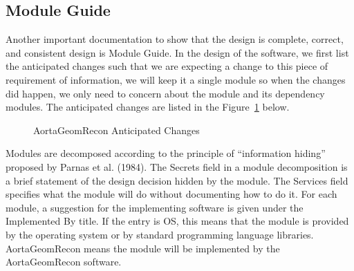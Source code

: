 \subsection{Module Guide}

Another important documentation to show that the design is complete, correct, and consistent design is Module Guide. In the design of the software, we first list the anticipated changes such that we are expecting a change to this piece of requirement of information, we will keep it a single module so when the changes did happen, we only need to concern about the module and its dependency modules. The anticipated changes are listed in the Figure~\ref{fig_agr_ac} below.

\begin{figure}[H]
    \centering
    \caption[AortaGeomRecon Anticipated Changes]{AortaGeomRecon Anticipated Changes}
    \label{fig_agr_ac}
\end{figure}

Modules are decomposed according to the principle of “information hiding” proposed by Parnas et al. (1984). The Secrets field in a module decomposition is a brief statement of the design decision hidden by the module. The Services field specifies what the module will do without documenting how to do it. For each module, a suggestion for the implementing software is given under the Implemented By title. If the entry is OS, this means that the module is provided by the operating system or by standard programming language libraries. AortaGeomRecon means the module will be implemented by the AortaGeomRecon software.

